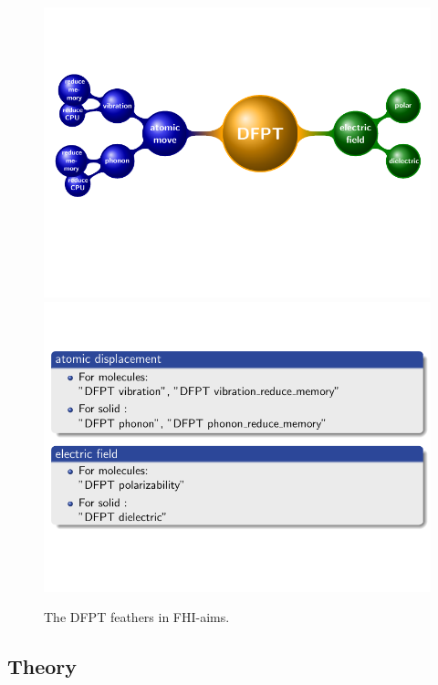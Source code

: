 \begin{figure}
\includegraphics[width=0.98\columnwidth]{DFPT_map}
\includegraphics[width=0.98\columnwidth]{DFPT_toolkit}
\caption{The DFPT feathers in FHI-aims.}
\end{figure}





\subsection*{Theory}
